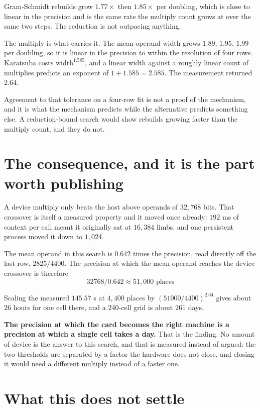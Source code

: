 Gram-Schmidt rebuilds grow \(1.77\times\) then \(1.85\times\) per doubling, which is close to linear in the precision and is the same rate the multiply count grows at over the same two steps. The reduction is not outpacing anything.

The multiply is what carries it. The mean operand width grows \(1.89\), \(1.95\), \(1.99\) per doubling, so it is linear in the precision to within the resolution of four rows. Karatsuba costs \(\mathrm{width}^{1.585}\), and a linear width against a roughly linear count of multiplies predicts an exponent of \(1 + 1.585 = 2.585\). The measurement returned \(2.64\).

Agreement to that tolerance on a four-row fit is not a proof of the mechanism, and it is what the mechanism predicts while the alternative predicts something else. A reduction-bound search would show rebuilds growing faster than the multiply count, and they do not.

\section{The consequence, and it is the part worth publishing}

A device multiply only beats the host above operands of \(32{,}768\) bits. That crossover is itself a measured property and it moved once already: \(192\) ms of context per call meant it originally sat at \(16{,}384\) limbs, and one persistent process moved it down to \(1{,}024\).

The mean operand in this search is \(0.642\) times the precision, read directly off the last row, \(2825/4400\). The precision at which the mean operand reaches the device crossover is therefore
\[
32768 / 0.642 \approx 51{,}000 \text{ places}
\]

Scaling the measured \(145.57\) s at \(4{,}400\) places by \((51000/4400)^{2.64}\) gives about \(26\) hours for one cell there, and a \(240\)-cell grid is about \(261\) days.

\textbf{The precision at which the card becomes the right machine is a precision at which a single cell takes a day.} That is the finding. No amount of device is the answer to this search, and that is measured instead of argued: the two thresholds are separated by a factor the hardware does not close, and closing it would need a different multiply instead of a faster one.

\section{What this does not settle}


